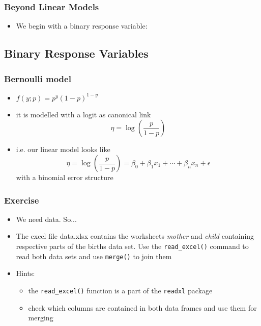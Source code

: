 \begin{frame}\frametitle{Beyond Linear Models}
  \begin{itemize}
    \item We begin with a binary response variable:
  \end{itemize}
\end{frame}

\subsection{Binary Response Variables}

\begin{frame}\frametitle{Bernoulli model}
  \begin{itemize}
  \item $f(y;p) = p^y(1-p)^{1-y}$
  \item it is modelled with a logit as canonical link $$ \eta = \log(\frac{p}{1-p})$$
  \item i.e. our linear model looks like $$ \eta = \log(\frac{p}{1-p}) = \beta_0 + \beta_1 x_1 + \cdots + \beta_n x_n + \epsilon$$ with a binomial error structure
  \end{itemize}
\end{frame}

\begin{frame}\frametitle{Exercise}
  \begin{itemize}
  \item We need data. So...
  \item The excel file data.xlsx contains the worksheets \textit{mother} and \textit{child} containing respective parts of the births data set. Use the \texttt{read\_excel()} command to read both data sets and use \texttt{merge()} to join them
  \item Hints: 
    \begin{itemize}
    \item the \texttt{read\_excel()} function is a part of the \texttt{readxl} package
    \item check which columns are contained in both data frames and use them for merging
    \end{itemize}
  \end{itemize}
\end{frame}


